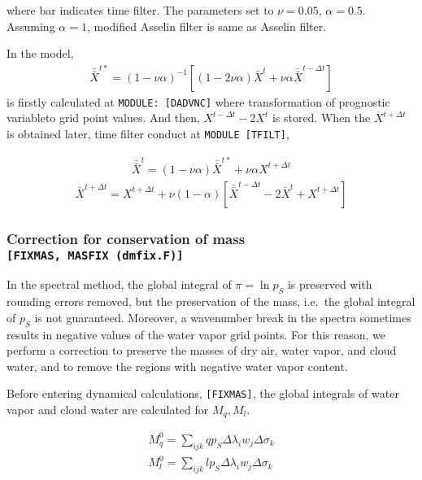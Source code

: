 where bar indicates time filter. The parameters set to \(\nu=0.05\),
\(\alpha=0.5\). Assuming \(\alpha=1\), modified Asselin filter is same
as Asselin filter.

In the model, \begin{eqnarray}
 \bar{\bar{X}}^{t*} = (1-\nu\alpha)^{-1}[(1-2\nu\alpha)\bar{X}^t +\nu\alpha \bar{\bar{X}}^{t-\Delta t} ]
\end{eqnarray} is firstly calculated at \texttt{MODULE:\ {[}DADVNC{]}} where
transformation of prognostic variableto grid point values. And then,
\(X^{t-\Delta t}-2X^t\) is stored. When the \(X^{t+\Delta t}\) is
obtained later, time filter conduct at \texttt{MODULE\ {[}TFILT{]}},

\begin{eqnarray}
 \bar{\bar{X}}^{t} = (1-\nu\alpha)\bar{\bar{X}}^{t*} +\nu\alpha X^{t+\Delta t}
\end{eqnarray} \begin{eqnarray}
\bar{X}^{t+\Delta t} = X^{t+\Delta t} + \nu (1-\alpha)[ \bar{\bar{X}}^{t-\Delta t} - 2\bar{X}^{t} + X^{t+\Delta t}]
 \end{eqnarray}

\hypertarget{correction-for-conservation-of-mass-fixmas-masfix-dmfix.f}{%
\subsubsection{\texorpdfstring{Correction for conservation of mass
\texttt{{[}FIXMAS,\ MASFIX\ (dmfix.F){]}}}{Correction for conservation of mass {[}FIXMAS, MASFIX (dmfix.F){]}}}\label{correction-for-conservation-of-mass-fixmas-masfix-dmfix.f}}

In the spectral method, the global integral of \(\pi = \ln p_S\) is
preserved with rounding errors removed, but the preservation of the
mass, i.e.~the global integral of \(p_S\) is not guaranteed. Moreover, a
wavenumber break in the spectra sometimes results in negative values of
the water vapor grid points. For this reason, we perform a correction to
preserve the masses of dry air, water vapor, and cloud water, and to
remove the regions with negative water vapor content.

Before entering dynamical calculations, \texttt{{[}FIXMAS{]}}, the
global integrals of water vapor and cloud water are calculated for
\(M_q, M_l\).

\begin{eqnarray}
  M_q^0  =  \sum_{ijk} q p_S  \Delta\lambda_i w_j \Delta\sigma_k  \\
  M_l^0  =  \sum_{ijk} l p_S  \Delta\lambda_i w_j \Delta\sigma_k
\end{eqnarray}

